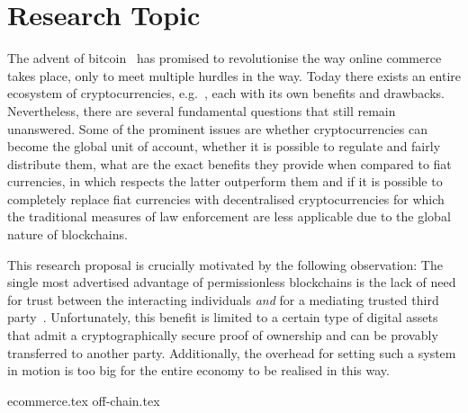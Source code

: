 \section{Research Topic}
  The advent of bitcoin~\cite{bitcoin} has promised to revolutionise the way online
  commerce takes place, only to meet multiple hurdles in the way. Today there exists an
  entire ecosystem of cryptocurrencies, e.g.~\cite{ethereum,zcash,ouroboros}, each with
  its own benefits and drawbacks. Nevertheless, there are several fundamental questions
  that still remain unanswered. Some of the prominent issues are whether cryptocurrencies
  can become the global unit of account, whether it is possible to regulate and fairly
  distribute them, what are the exact benefits they provide when compared to fiat
  currencies, in which respects the latter outperform them and if it is possible to
  completely replace fiat currencies with decentralised cryptocurrencies for which the
  traditional measures of law enforcement are less applicable due to the global nature of
  blockchains.

  This research proposal is crucially motivated by the following observation: The single
  most advertised advantage of permissionless blockchains is the lack of need for trust
  between the interacting individuals \textit{and} for a mediating trusted third
  party~\cite{bitcoin}. Unfortunately, this benefit is limited to a certain type of
  digital assets that admit a cryptographically secure proof of ownership and can be
  provably transferred to another party. Additionally, the overhead for setting such a
  system in motion is too big for the entire economy to be realised in this way.

  {ecommerce.tex}
  {off-chain.tex}
